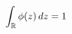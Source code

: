\documentclass[preview]{standalone}
\begin{document}
\begin{align*}
\special{dvisvgm:raw <g id='unique000'>}\int_{\mathbb R}\phi(z)\,dz=1\special{dvisvgm:raw </g>}
\end{align*}
\end{document}
